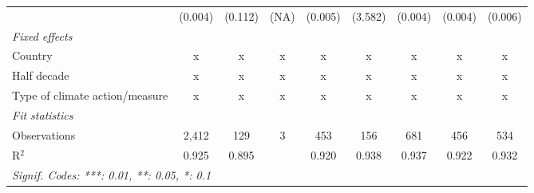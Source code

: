 \begin{table}[htbp]
\begin{tabular}{lcccccccc}
                                                                     & (0.004)       & (0.112)                   & (NA)         & (0.005)        & (3.582)          & (0.004)         & (0.004)         & (0.006)\\   
      \emph{Fixed effects}\\
      Country                                                        & x             & x                         & x            & x              & x                & x               & x               & x\\  
      Half decade                                                    & x             & x                         & x            & x              & x                & x               & x               & x\\  
      Type of climate action/measure                                 & x             & x                         & x            & x              & x                & x               & x               & x\\  
      \midrule \emph{Fit statistics}\\
      Observations                                                   & 2,412         & 129                       & 3            & 453            & 156              & 681             & 456             & 534\\  
      R$^2$                                                          & 0.925         & 0.895                     &              & 0.920          & 0.938            & 0.937           & 0.922           & 0.932\\  
      \midrule
      \multicolumn{9}{l}{\emph{Signif. Codes: ***: 0.01, **: 0.05, *: 0.1}}\\
   \end{tabular}
\end{table}


